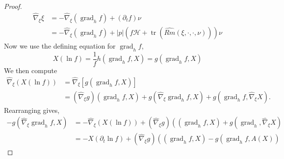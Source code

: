 \documentclass{amsart}
\theoremstyle{definition}
\theoremstyle{remark}
\numberwithin{equation}{section}
\begin{document}
\begin{proof}
\begin{equation}
\label{eq:dt_transverse_productrule}
\begin{split}
\hat{\nabla}_{\xi}\xi &= -\hat{\nabla}_{\xi} \left(\operatorname{grad}_h f\right) + (\partial_t f) \nu \\
&= -\hat{\nabla}_{\xi}\left(\operatorname{grad}_h f\right) + |p|(f\mathcal{H}+\operatorname{tr} (\widehat{Rm}(\xi,\cdot,\cdot,\nu))) \nu
\end{split}
\end{equation}
Now we use the defining equation for $\operatorname{grad}_h f$,
\[
X(\ln f) = \frac{1}{f} h(\operatorname{grad}_h f, X) = g(\operatorname{grad}_h f, X)
\]
We then compute
\[
\begin{split}
\hat{\nabla}_{\xi} \left(X(\ln f)\right) &= \hat{\nabla}_{\xi} \left[g(\operatorname{grad}_h f, X)\right] \\
&= (\hat{\nabla}_{\xi} g) (\operatorname{grad}_h f, X) + g(\hat{\nabla}_{\xi} \operatorname{grad}_h f, X) + g(\operatorname{grad}_h f,  \hat{\nabla}_{\xi} X).
\end{split}
\]
Rearranging gives,
\begin{equation}
\label{eq:dt_transversegradient_structure}
\begin{split}
-g(\hat{\nabla}_{\xi} \operatorname{grad}_h f, X) &= -\hat{\nabla}_{\xi} \left(X(\ln f)\right) + (\hat{\nabla}_{\xi} g) (\operatorname(\operatorname{grad}_h f, X) + g(\operatorname{grad}_h,  \hat{\nabla}_{\xi} X) \\
&= -X(\partial_t \ln f) + (\hat{\nabla}_{\xi} g) (\operatorname(\operatorname{grad}_h f, X) - g(\operatorname{grad}_h f,  A(X))
\end{split}
\end{equation}


\end{proof}
\end{document}
